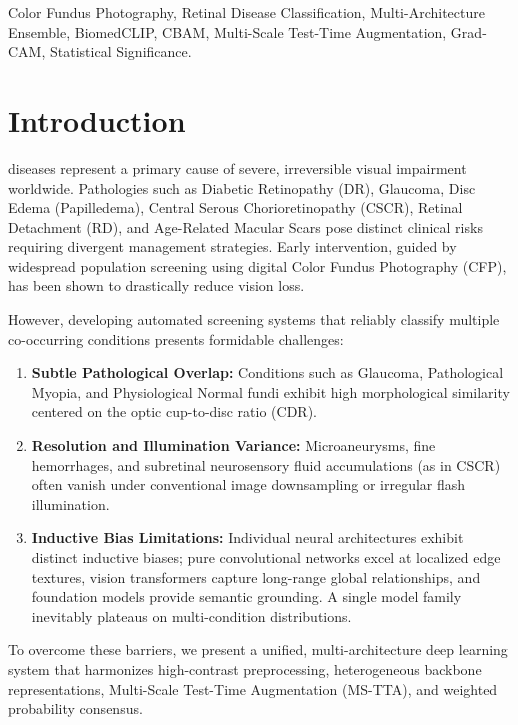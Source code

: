 \documentclass[journal]{IEEEtran}
\begin{document}
\begin{IEEEkeywords}
Color Fundus Photography, Retinal Disease Classification, Multi-Architecture Ensemble, BiomedCLIP, CBAM, Multi-Scale Test-Time Augmentation, Grad-CAM, Statistical Significance.
\end{IEEEkeywords}

\section{Introduction}
 diseases represent a primary cause of severe, irreversible visual impairment worldwide. Pathologies such as Diabetic Retinopathy (DR), Glaucoma, Disc Edema (Papilledema), Central Serous Chorioretinopathy (CSCR), Retinal Detachment (RD), and Age-Related Macular Scars pose distinct clinical risks requiring divergent management strategies. Early intervention, guided by widespread population screening using digital Color Fundus Photography (CFP), has been shown to drastically reduce vision loss.

However, developing automated screening systems that reliably classify multiple co-occurring conditions presents formidable challenges:
\begin{enumerate}
    \item \textbf{Subtle Pathological Overlap:} Conditions such as Glaucoma, Pathological Myopia, and Physiological Normal fundi exhibit high morphological similarity centered on the optic cup-to-disc ratio (CDR).
    \item \textbf{Resolution and Illumination Variance:} Microaneurysms, fine hemorrhages, and subretinal neurosensory fluid accumulations (as in CSCR) often vanish under conventional image downsampling or irregular flash illumination.
    \item \textbf{Inductive Bias Limitations:} Individual neural architectures exhibit distinct inductive biases; pure convolutional networks excel at localized edge textures, vision transformers capture long-range global relationships, and foundation models provide semantic grounding. A single model family inevitably plateaus on multi-condition distributions.
\end{enumerate}

To overcome these barriers, we present a unified, multi-architecture deep learning system that harmonizes high-contrast preprocessing, heterogeneous backbone representations, Multi-Scale Test-Time Augmentation (MS-TTA), and weighted probability consensus.
\end{document}
